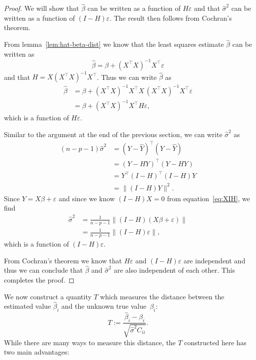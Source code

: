 \documentclass[
  a4paper,
]{article}
\theoremstyle{definition}
\theoremstyle{definition}
\theoremstyle{definition}
\theoremstyle{definition}
\theoremstyle{remark}
\begin{document}
\begin{proof}
We will show that \(\hat\beta\) can be written as a function of \(H\varepsilon\)
and that \(\hat\sigma^2\) can be written as a function of \((I-H)\varepsilon\).
The result then follows from Cochran's theorem.

From lemma~\ref{lem:hat-beta-dist}
we know that the least squares estimate \(\hat\beta\) can be written as
\begin{equation*}
  \hat\beta
  = \beta + (X^\top X)^{-1} X^\top \varepsilon
\end{equation*}
and that \(H = X (X^\top X)^{-1} X^\top\). Thus we can write \(\hat\beta\) as
\begin{align*}
  \hat\beta
  &= \beta + (X^\top X)^{-1} X^\top X \, (X^\top X)^{-1} X^\top \varepsilon\\
  &= \beta + (X^\top X)^{-1} X^\top H \varepsilon,
\end{align*}
which is a function of \(H\varepsilon\).

Similar to the argument at the end of the previous section, we can
write \(\hat\sigma^2\) as
\begin{align*}
  (n - p - 1) \hat\sigma^2
  &= (Y - \hat Y)^\top (Y - \hat Y) \\
  &= (Y - H Y)^\top (Y - H Y) \\
  &= Y^\top (I - H)^\top (I - H) Y \\
  &= \bigl\| (I - H) Y \|^2.
\end{align*}
Since \(Y = X\beta + \varepsilon\) and since we know \((I-H)X = 0\) from
equation~\eqref{eq:XIH}, we find
\begin{align*}
  \hat\sigma^2
  &= \frac{1}{n-p-1} \bigl\| (I - H) (X\beta + \varepsilon) \| \\
  &= \frac{1}{n-p-1} \bigl\| (I - H) \varepsilon\|,
\end{align*}
which is a function of \((I - H)\varepsilon\).

From Cochran's theorem we know that \(H \varepsilon\) and \((I-H)\varepsilon\) are independent
and thus we can conclude that \(\hat\beta\) and \(\hat\sigma^2\) are also
independent of each other. This completes the proof.
\end{proof}

We now construct a quantity \(T\) which measures the distance between
the estimated value \(\hat\beta_i\) and the unknown true value~\(\beta_i\):
\begin{equation}
  T
  := \frac{\hat\beta_i - \beta_i}{\sqrt{\hat\sigma^2 C_{ii}}}. \label{eq:single-T}
\end{equation}
While there are many ways to measure this distance, the \(T\) constructed
here has two main advantages:
\end{document}
